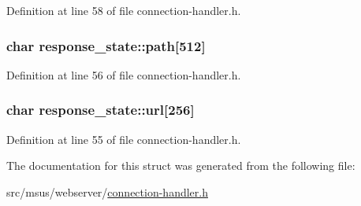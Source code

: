 Definition at line 58 of file connection-\/handler.\-h.

\hypertarget{structresponse__state_a75a4c831eb68ee7fa4461880cae317fd}{
\subsubsection[{path}]{\setlength{\rightskip}{0pt plus 5cm}char response\-\_\-state\-::path\mbox{[}512\mbox{]}}}\label{structresponse__state_a75a4c831eb68ee7fa4461880cae317fd}


Definition at line 56 of file connection-\/handler.\-h.

\hypertarget{structresponse__state_a8f1c401abbed7387d7e60181d0cb2791}{
\subsubsection[{url}]{\setlength{\rightskip}{0pt plus 5cm}char response\-\_\-state\-::url\mbox{[}256\mbox{]}}}\label{structresponse__state_a8f1c401abbed7387d7e60181d0cb2791}


Definition at line 55 of file connection-\/handler.\-h.



The documentation for this struct was generated from the following file\-:\begin{DoxyCompactItemize}
\item 
src/msus/webserver/\hyperlink{connection-handler_8h}{connection-\/handler.\-h}\end{DoxyCompactItemize}

